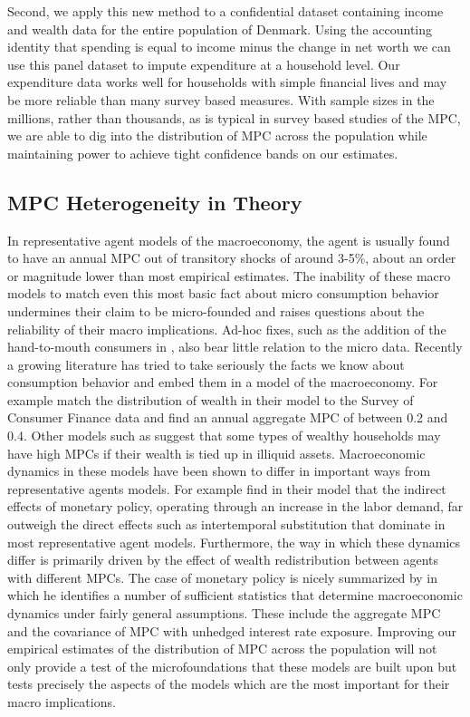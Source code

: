 \documentclass[titlepage]{\econtex}\newcommand{\texname}{IncomeUncertainty}
\begin{document}
Second, we apply this new method to a confidential dataset containing income and wealth data for the entire population of Denmark. Using the accounting identity that spending is equal to income minus the change in net worth we can use this panel dataset to impute expenditure at a household level. Our expenditure data works well for households with simple financial lives and may be more reliable than many survey based measures. With sample sizes in the millions, rather than thousands, as is typical in survey based studies of the MPC, we are able to dig into the distribution of MPC across the population while maintaining power to achieve tight confidence bands on our estimates.

\subsection{MPC Heterogeneity in Theory}
In representative agent models of the macroeconomy, the agent is usually found to have an annual MPC out of transitory shocks of around 3-5\%, about an order or magnitude lower than most empirical estimates. The inability of these macro models to match even this most basic fact about micro consumption behavior undermines their claim to be micro-founded and raises questions about the reliability of their macro implications. Ad-hoc fixes, such as the addition of the hand-to-mouth consumers in \cite{campbell_consumption_1989}, also bear little relation to the micro data. Recently a growing literature has tried to take seriously the facts we know about consumption behavior and embed them in a model of the macroeconomy. For example \cite{carroll_distribution_2016} match the distribution of wealth in their model to the Survey of Consumer Finance data and find an annual aggregate MPC of between 0.2 and 0.4. Other models such as \cite{kaplan_model_2014} suggest that some types of wealthy households may have high MPCs if their wealth is tied up in illiquid assets. Macroeconomic dynamics in these models have been shown to differ in important ways from representative agents models. For example \cite{kaplan_monetary_2016} find in their model that the indirect effects of monetary policy, operating through an increase in the labor demand, far outweigh the direct effects such as intertemporal substitution that dominate in most representative agent models. Furthermore, the way in which these dynamics differ is primarily driven by the effect of wealth redistribution between agents with different MPCs. The case of monetary policy is nicely summarized by \cite{auclert_monetary_2015} in which he identifies a number of sufficient statistics that determine macroeconomic dynamics under fairly general assumptions. These include the aggregate MPC and the covariance of MPC with unhedged interest rate exposure. Improving our empirical estimates of the distribution of MPC across the population will not only provide a test of the microfoundations that these models are built upon but tests precisely the aspects of the models which are the most important for their macro implications.
\end{document}
